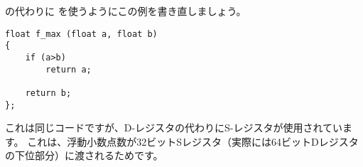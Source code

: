 
\Tdouble の代わりに \Tfloat を使うようにこの例を書き直しましょう。

\begin{lstlisting}[style=customc]
float f_max (float a, float b)
{
	if (a>b)
		return a;

	return b;
};
\end{lstlisting}



これは同じコードですが、D-レジスタの代わりにS-レジスタが使用されています。 
これは、浮動小数点数が32ビットSレジスタ（実際には64ビットDレジスタの下位部分）に渡されるためです。
